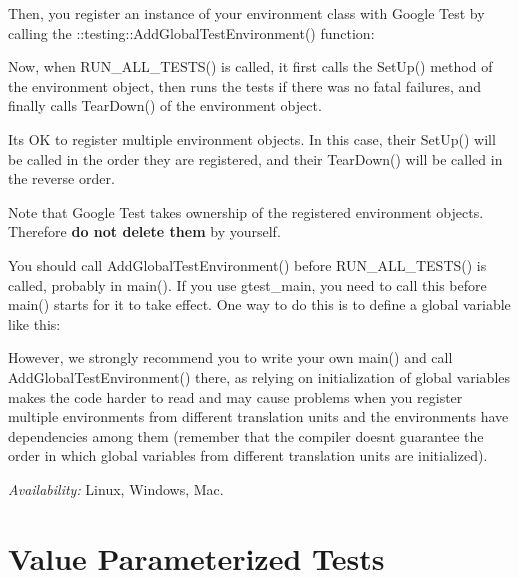 Then, you register an instance of your environment class with Google Test by calling the {\ttfamily \+::testing\+::\+Add\+Global\+Test\+Environment()} function\+:


\begin{DoxyCode}{0}
\end{DoxyCode}


Now, when {\ttfamily R\+U\+N\+\_\+\+A\+L\+L\+\_\+\+T\+E\+S\+T\+S()} is called, it first calls the {\ttfamily Set\+Up()} method of the environment object, then runs the tests if there was no fatal failures, and finally calls {\ttfamily Tear\+Down()} of the environment object.

It\textquotesingle{}s OK to register multiple environment objects. In this case, their {\ttfamily Set\+Up()} will be called in the order they are registered, and their {\ttfamily Tear\+Down()} will be called in the reverse order.

Note that Google Test takes ownership of the registered environment objects. Therefore {\bfseries{do not delete them}} by yourself.

You should call {\ttfamily Add\+Global\+Test\+Environment()} before {\ttfamily R\+U\+N\+\_\+\+A\+L\+L\+\_\+\+T\+E\+S\+T\+S()} is called, probably in {\ttfamily main()}. If you use {\ttfamily gtest\+\_\+main}, you need to call this before {\ttfamily main()} starts for it to take effect. One way to do this is to define a global variable like this\+:


\begin{DoxyCode}{0}
\end{DoxyCode}


However, we strongly recommend you to write your own {\ttfamily main()} and call {\ttfamily Add\+Global\+Test\+Environment()} there, as relying on initialization of global variables makes the code harder to read and may cause problems when you register multiple environments from different translation units and the environments have dependencies among them (remember that the compiler doesn\textquotesingle{}t guarantee the order in which global variables from different translation units are initialized).

{\itshape Availability\+:} Linux, Windows, Mac.

\section*{Value Parameterized Tests}

